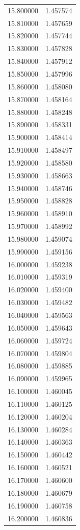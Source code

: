 \begin{tabular}{rr}
15.800000 & 1.457574 \\
15.810000 & 1.457659 \\
15.820000 & 1.457744 \\
15.830000 & 1.457828 \\
15.840000 & 1.457912 \\
15.850000 & 1.457996 \\
15.860000 & 1.458080 \\
15.870000 & 1.458164 \\
15.880000 & 1.458248 \\
15.890000 & 1.458331 \\
15.900000 & 1.458414 \\
15.910000 & 1.458497 \\
15.920000 & 1.458580 \\
15.930000 & 1.458663 \\
15.940000 & 1.458746 \\
15.950000 & 1.458828 \\
15.960000 & 1.458910 \\
15.970000 & 1.458992 \\
15.980000 & 1.459074 \\
15.990000 & 1.459156 \\
16.000000 & 1.459238 \\
16.010000 & 1.459319 \\
16.020000 & 1.459400 \\
16.030000 & 1.459482 \\
16.040000 & 1.459563 \\
16.050000 & 1.459643 \\
16.060000 & 1.459724 \\
16.070000 & 1.459804 \\
16.080000 & 1.459885 \\
16.090000 & 1.459965 \\
16.100000 & 1.460045 \\
16.110000 & 1.460125 \\
16.120000 & 1.460204 \\
16.130000 & 1.460284 \\
16.140000 & 1.460363 \\
16.150000 & 1.460442 \\
16.160000 & 1.460521 \\
16.170000 & 1.460600 \\
16.180000 & 1.460679 \\
16.190000 & 1.460758 \\
16.200000 & 1.460836 \\

\end{tabular}
